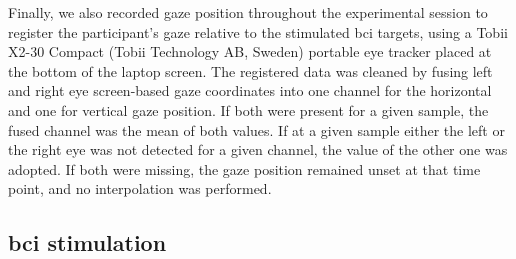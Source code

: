 \documentclass[twocolumn]{article}
\begin{document}
Finally, we also recorded gaze position throughout the experimental session to
register the participant's gaze relative to the stimulated \ac{bci} targets,
using a Tobii X2-30 Compact (Tobii
Technology AB, Sweden) portable eye tracker placed at the bottom of the laptop screen.
The registered data was cleaned by fusing left and right eye screen-based gaze
coordinates into one channel for the horizontal and one for vertical gaze position.
If both were present for a given sample, the fused channel was the mean of both
values.
If at a given sample either the left or the right eye was not detected for a
given channel, the value of the other one was adopted.
If both were missing, the gaze position remained unset at that time point, and no
interpolation was performed.



\subsection{\Acs{bci} stimulation}
\end{document}
